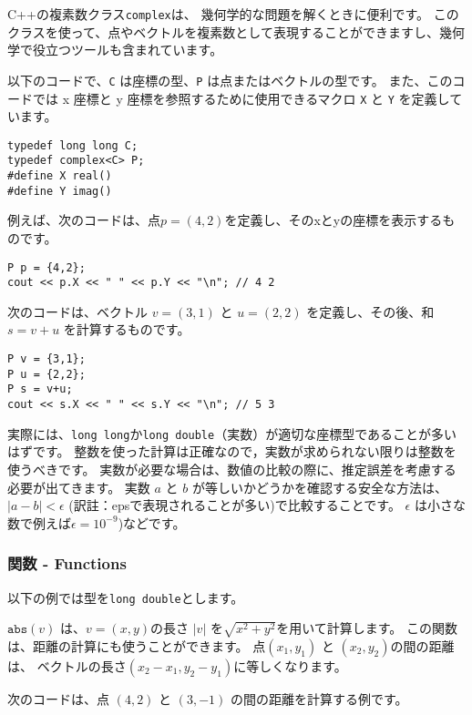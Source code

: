 
C++の複素数クラス\texttt{complex}は、
幾何学的な問題を解くときに便利です。
このクラスを使って、点やベクトルを複素数として表現することができますし、幾何学で役立つツールも含まれています。

以下のコードで、\texttt{C} は座標の型、\texttt{P} は点またはベクトルの型です。
また、このコードでは x 座標と y 座標を参照するために使用できるマクロ \texttt{X} と \texttt{Y} を定義しています。

\begin{lstlisting}
typedef long long C;
typedef complex<C> P;
#define X real()
#define Y imag()
\end{lstlisting}

例えば、次のコードは、点$p = (4, 2)$を定義し、そのxとyの座標を表示するものです。

\begin{lstlisting}
P p = {4,2};
cout << p.X << " " << p.Y << "\n"; // 4 2
\end{lstlisting}

次のコードは、ベクトル $v = (3, 1)$ と $u = (2, 2)$ を定義し、その後、和 $s = v + u$ を計算するものです。

\begin{lstlisting}
P v = {3,1};
P u = {2,2};
P s = v+u;
cout << s.X << " " << s.Y << "\n"; // 5 3
\end{lstlisting}

実際には、\texttt{long long}か\texttt{long double}（実数）が適切な座標型であることが多いはずです。
整数を使った計算は正確なので，実数が求められない限りは整数を使うべきです。
実数が必要な場合は、数値の比較の際に、推定誤差を考慮する必要が出てきます。
実数 $a$ と $b$ が等しいかどうかを確認する安全な方法は、
$|a-b|<\epsilon$ (訳註：epsで表現されることが多い)で比較することです。
$\epsilon$ は小さな数で例えば$\epsilon=10^{-9}$)などです。

\subsubsection*{関数 - Functions}

以下の例では型を\texttt{long double}とします。

$\texttt{abs}(v)$ は、$v=(x,y)$の長さ $|v|$ を$\sqrt{x^2+y^2}$を用いて計算します。
この関数は、距離の計算にも使うことができます。 点$(x_1,y_1)$ と $(x_2,y_2)$の間の距離は、
ベクトルの長さ$(x_2-x_1,y_2-y_1)$に等しくなります。

次のコードは、点 $(4, 2)$ と $(3, -1)$ の間の距離を計算する例です。


